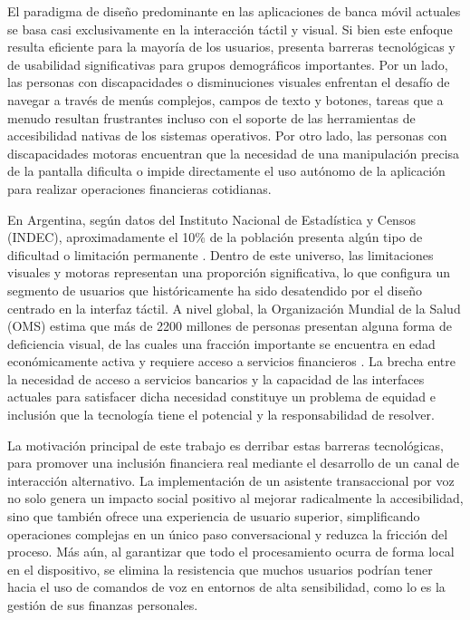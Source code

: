 El paradigma de diseño predominante en las aplicaciones de banca móvil actuales se basa casi exclusivamente en la interacción táctil y visual. Si bien este enfoque resulta eficiente para la mayoría de los usuarios, presenta barreras tecnológicas y de usabilidad significativas para grupos demográficos importantes. Por un lado, las personas con discapacidades o disminuciones visuales enfrentan el desafío de navegar a través de menús complejos, campos de texto y botones, tareas que a menudo resultan frustrantes incluso con el soporte de las herramientas de accesibilidad nativas de los sistemas operativos. Por otro lado, las personas con discapacidades motoras encuentran que la necesidad de una manipulación precisa de la pantalla dificulta o impide directamente el uso autónomo de la aplicación para realizar operaciones financieras cotidianas.

En Argentina, según datos del Instituto Nacional de Estadística y Censos (INDEC), aproximadamente el 10\% de la población presenta algún tipo de dificultad o limitación permanente \citep{indec2018eppd}. Dentro de este universo, las limitaciones visuales y motoras representan una proporción significativa, lo que configura un segmento de usuarios que históricamente ha sido desatendido por el diseño centrado en la interfaz táctil. A nivel global, la Organización Mundial de la Salud (OMS) estima que más de 2200 millones de personas presentan alguna forma de deficiencia visual, de las cuales una fracción importante se encuentra en edad económicamente activa y requiere acceso a servicios financieros \citep{oms2019vision}. La brecha entre la necesidad de acceso a servicios bancarios y la capacidad de las interfaces actuales para satisfacer dicha necesidad constituye un problema de equidad e inclusión que la tecnología tiene el potencial y la responsabilidad de resolver.

La motivación principal de este trabajo es derribar estas barreras tecnológicas, para promover una inclusión financiera real mediante el desarrollo de un canal de interacción alternativo. La implementación de un asistente transaccional por voz no solo genera un impacto social positivo al mejorar radicalmente la accesibilidad, sino que también ofrece una experiencia de usuario superior, simplificando operaciones complejas en un único paso conversacional y reduzca la fricción del proceso. Más aún, al garantizar que todo el procesamiento ocurra de forma local en el dispositivo, se elimina la resistencia que muchos usuarios podrían tener hacia el uso de comandos de voz en entornos de alta sensibilidad, como lo es la gestión de sus finanzas personales.
